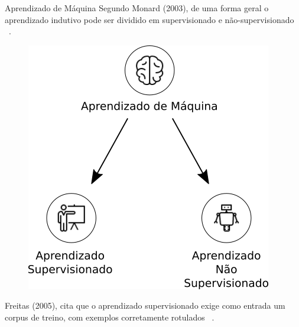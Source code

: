 \documentclass[10pt]{beamer}
\begin{document}
  \begin{frame}[fragile]{Aprendizado de Máquina}
    Segundo Monard (2003), de uma forma geral o aprendizado indutivo pode ser dividido em supervisionado e não-supervisionado ~\cite{monard_baranauskas:2003}.
    \begin{figure}[H]
    \begin{center}
        \includegraphics[scale=0.45]{images/supervised_unsupervised.png}
    \end{center}
    \end{figure}
    Freitas (2005), cita que o aprendizado supervisionado exige como entrada um corpus de treino, com exemplos corretamente rotulados ~\cite{de2005anotaccao}.
  \end{frame}
\end{document}
